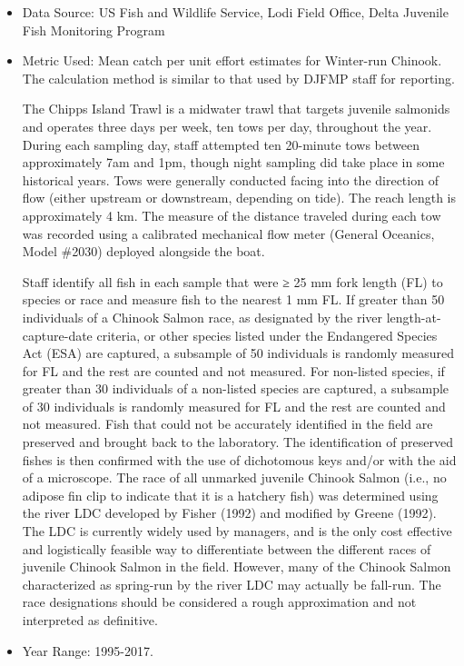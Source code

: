 \documentclass[
]{book}
\begin{document}
\begin{itemize}
\item
  Data Source: US Fish and Wildlife Service, Lodi Field Office, Delta Juvenile Fish Monitoring Program
\item
  Metric Used: Mean catch per unit effort estimates for Winter-run Chinook. The calculation method is similar to that used by DJFMP staff for reporting.

  The Chipps Island Trawl is a midwater trawl that targets juvenile salmonids and operates three days per week, ten tows per day, throughout the year. During each sampling day, staff attempted ten 20-minute tows between approximately 7am and 1pm, though night sampling did take place in some historical years. Tows were generally conducted facing into the direction of flow (either upstream or downstream, depending on tide). The reach length is approximately 4 km. The measure of the distance traveled during each tow was recorded using a calibrated mechanical flow meter (General Oceanics, Model \#2030) deployed alongside the boat.

  Staff identify all fish in each sample that were ≥ 25 mm fork length (FL) to species or race and measure fish to the nearest 1 mm FL. If greater than 50 individuals of a Chinook Salmon race, as designated by the river length-at-capture-date criteria, or other species listed under the Endangered Species Act (ESA) are captured, a subsample of 50 individuals is randomly measured for FL and the rest are counted and not measured. For non-listed species, if greater than 30 individuals of a non-listed species are captured, a subsample of 30 individuals is randomly measured for FL and the rest are counted and not measured. Fish that could not be accurately identified in the field are preserved and brought back to the laboratory. The identification of preserved fishes is then confirmed with the use of dichotomous keys and/or with the aid of a microscope. The race of all unmarked juvenile Chinook Salmon (i.e., no adipose fin clip to indicate that it is a hatchery fish) was determined using the river LDC developed by Fisher (1992) and modified by Greene (1992). The LDC is currently widely used by managers, and is the only cost effective and logistically feasible way to differentiate between the different races of juvenile Chinook Salmon in the field. However, many of the Chinook Salmon characterized as spring-run by the river LDC may actually be fall-run. The race designations should be considered a rough approximation and not interpreted as definitive.
\item
  Year Range: 1995-2017.


\end{itemize}
\end{document}
